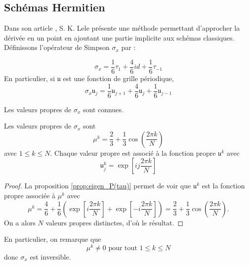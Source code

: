 \subsection{Schémas Hermitien}

Dans son article \cite{Lele1991}, S. K. Lele présente une méthode permettant d'approcher la dérivée en un point en ajoutant une partie implicite aux schémas classiques. Définissons l'opérateur de Simpson $\sigma_{x}$ par :

\begin{equation}
\sigma_{x}  = \dfrac{1}{6} \tau_1 + \dfrac{4}{6} id + \dfrac{1}{6}\tau_{-1}
\end{equation}
En particulier, si $\mathfrak{u}$ est une fonction de grille périodique,
\begin{equation}
\sigma_x \mathfrak{u}_j = \dfrac{1}{6} \mathfrak{u}_{j+1} + \dfrac{4}{6} \mathfrak{u}_j + \dfrac{1}{6} \mathfrak{u}_{j-1}
\end{equation}

Les valeurs propres de $\sigma_x$ sont connues.
\begin{proposition}
Les valeurs propres de $\sigma_x$ sont 
\begin{equation}
\mu^k = \dfrac{2}{3} + \dfrac{1}{3} \cos \left( \dfrac{2 \pi k}{N} \right)
\end{equation}
avec $1 \leq k \leq N$. Chaque valeur propre est associé à la fonction propre $\mathfrak{u}^k$ avec 
\begin{equation}
\mathfrak{u}_j^k = \exp \left[ i j \dfrac{2 \pi k}{N} \right]
\end{equation}
\label{prop:vp_sigma}
\end{proposition}

\begin{proof}
La proposition \ref{prop:eigen_P(tau)} permet de voir que $\mathfrak{u}^k$ est la fonction propre associée à $\mu^k$ avec 
\begin{equation}
\mu^k = \dfrac{4}{6} + \dfrac{1}{6} \left( \exp \left[ i \dfrac{2 \pi k}{N} \right] + \exp \left[ - i \dfrac{2 \pi k}{N} \right] \right) = \dfrac{2}{3} + \dfrac{1}{3} \cos \left( \dfrac{2 \pi k}{N} \right).
\end{equation}
On a alors $N$ valeurs propres distinctes, d'où le résultat.
\end{proof}
En particulier, on remarque que 
\begin{equation}
\mu^k \neq 0 \text{ pour tout } 1 \leq k \leq N
\end{equation}
donc $\sigma_x$ est inversible.

